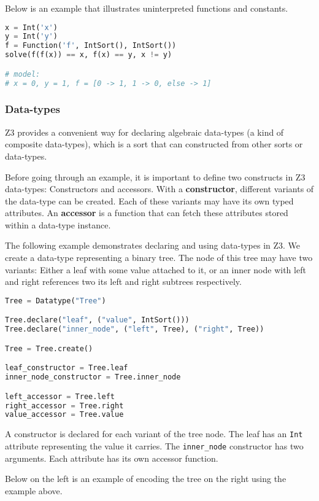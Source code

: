 Below is an example that illustrates uninterpreted functions and constants.

\begin{lstlisting}[language=python]
x = Int('x')
y = Int('y')
f = Function('f', IntSort(), IntSort())
solve(f(f(x)) == x, f(x) == y, x != y)

# model:
# x = 0, y = 1, f = [0 -> 1, 1 -> 0, else -> 1]
\end{lstlisting}

\subsubsection{Data-types}
Z3 provides a convenient way for declaring algebraic data-types (a kind of composite data-types), which is a sort that can constructed from other sorts or data-types.

Before going through an example, it is important to define two constructs in Z3 data-types: Constructors and accessors. With a \textbf{constructor}, different variants of the data-type can be created. Each of these variants may have its own typed attributes. An \textbf{accessor} is a function that can fetch these attributes stored within a data-type instance.

The following example demonstrates declaring and using data-types in Z3. We create a data-type representing a binary tree. The node of this tree may have two variants: Either a leaf with some value attached to it, or an inner node with left and right references two its left and right subtrees respectively.

\begin{lstlisting}[language=python]
Tree = Datatype("Tree")

Tree.declare("leaf", ("value", IntSort()))
Tree.declare("inner_node", ("left", Tree), ("right", Tree))

Tree = Tree.create()

leaf_constructor = Tree.leaf
inner_node_constructor = Tree.inner_node

left_accessor = Tree.left
right_accessor = Tree.right
value_accessor = Tree.value
\end{lstlisting}

A constructor is declared for each variant of the tree node. The leaf has an \lstinline|Int| attribute representing the value it carries. The \lstinline|inner_node| constructor has two arguments. Each attribute has its own accessor function.

Below on the left is an example of encoding the tree on the right using the example above.


